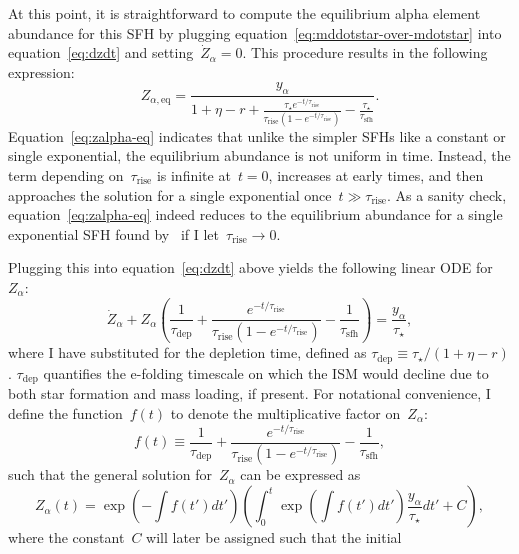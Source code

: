 \documentclass[12pt]{article}
\newcommand{\ddfrac}[2]{\frac{\displaystyle{#1}}{\displaystyle{#2}}}
\newcommand{\timescale}[1]{\ensuremath{\tau_\text{#1}}}
\begin{document}
At this point, it is straightforward to compute the equilibrium alpha element
abundance for this SFH by plugging equation~\ref{eq:mddotstar-over-mdotstar}
into equation~\ref{eq:dzdt} and setting~$\dot{Z}_\alpha = 0$.
This procedure results in the following expression:
\begin{equation}
Z_{\alpha,\text{eq}} = \ddfrac{
	y_\alpha
}{
	1 + \eta - r + \frac{
		\tau_\star e^{-t / \timescale{rise}}
	}{
		\timescale{rise}(1 - e^{-t / \timescale{rise}})
	} - \frac{\tau_\star}{\timescale{sfh}}
}.
\label{eq:zalpha-eq}
\end{equation}
Equation~\ref{eq:zalpha-eq} indicates that unlike the simpler SFHs like a
constant or single exponential, the equilibrium abundance is not uniform in
time.
Instead, the term depending on~\timescale{rise} is infinite at~$t = 0$,
increases at early times, and then approaches the solution for a single
exponential once~$t \gg \timescale{rise}$.
As a sanity check, equation~\ref{eq:zalpha-eq} indeed reduces to the
equilibrium abundance for a single exponential SFH found
by~\citet*{Weinberg2017} if I let~$\timescale{rise} \rightarrow 0$.
\par
Plugging this into equation~\ref{eq:dzdt} above yields the following linear
ODE for~$Z_\alpha$:
\begin{equation}
\dot{Z}_\alpha + Z_\alpha \left(\frac{1}{\timescale{dep}} +
\frac{
	e^{-t / \timescale{rise}}
}{
	\timescale{rise}(1 - e^{-t / \timescale{rise}})
} - \frac{1}{\timescale{sfh}}\right) = \frac{y_\alpha}{\tau_\star},
\end{equation}
where I have substituted for the depletion time, defined as
$\timescale{dep} \equiv \tau_\star / (1 + \eta - r)$.
$\timescale{dep}$ quantifies the e-folding timescale on which the ISM would
decline due to both star formation and mass loading, if present.
For notational convenience, I define the function~$f(t)$ to denote the
multiplicative factor on~$Z_\alpha$:
\begin{equation}
f(t) \equiv \frac{1}{\timescale{dep}} + \frac{
	e^{-t / \timescale{rise}}
}{
	\timescale{rise}(1 - e^{-t / \timescale{rise}})
} - \frac{1}{\timescale{sfh}},
\end{equation}
such that the general solution for~$Z_\alpha$ can be expressed as
\begin{equation}
Z_\alpha(t) = \exp\left(-\int f(t') dt'\right)\left(
\int_0^t \exp\left(\int f(t') dt'\right) \frac{y_\alpha}{\tau_\star} dt' + C
\right),
\label{eq:za-linear-ode}
\end{equation}
where the constant~$C$ will later be assigned such that the initial
\end{document}
